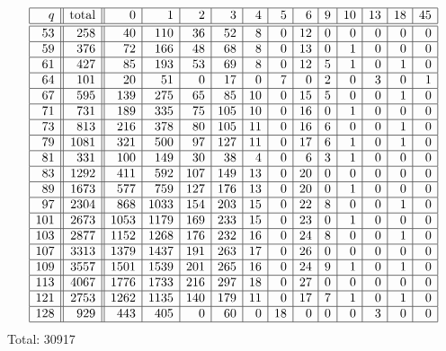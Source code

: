 $$
\begin{array}{|r||r||*{12}{r|}}
\hline
q  & \mbox{total}  & 0 & 1 & 2 & 3 & 4 & 5 & 6 & 9 & 10 & 13 & 18 & 45\\
\hline
\hline
53 & 258 & 40 & 110 & 36 & 52 & 8 & 0 & 12 & 0 & 0 & 0 & 0 & 0\\
\hline
59 & 376 & 72 & 166 & 48 & 68 & 8 & 0 & 13 & 0 & 1 & 0 & 0 & 0\\
\hline
61 & 427 & 85 & 193 & 53 & 69 & 8 & 0 & 12 & 5 & 1 & 0 & 1 & 0\\
\hline
64 & 101 & 20 & 51 & 0 & 17 & 0 & 7 & 0 & 2 & 0 & 3 & 0 & 1\\
\hline
67 & 595 & 139 & 275 & 65 & 85 & 10 & 0 & 15 & 5 & 0 & 0 & 1 & 0\\
\hline
71 & 731 & 189 & 335 & 75 & 105 & 10 & 0 & 16 & 0 & 1 & 0 & 0 & 0\\
\hline
73 & 813 & 216 & 378 & 80 & 105 & 11 & 0 & 16 & 6 & 0 & 0 & 1 & 0\\
\hline
79 & 1081 & 321 & 500 & 97 & 127 & 11 & 0 & 17 & 6 & 1 & 0 & 1 & 0\\
\hline
81 & 331 & 100 & 149 & 30 & 38 & 4 & 0 & 6 & 3 & 1 & 0 & 0 & 0\\
\hline
83 & 1292 & 411 & 592 & 107 & 149 & 13 & 0 & 20 & 0 & 0 & 0 & 0 & 0\\
\hline
89 & 1673 & 577 & 759 & 127 & 176 & 13 & 0 & 20 & 0 & 1 & 0 & 0 & 0\\
\hline
97 & 2304 & 868 & 1033 & 154 & 203 & 15 & 0 & 22 & 8 & 0 & 0 & 1 & 0\\
\hline
101 & 2673 & 1053 & 1179 & 169 & 233 & 15 & 0 & 23 & 0 & 1 & 0 & 0 & 0\\
\hline
103 & 2877 & 1152 & 1268 & 176 & 232 & 16 & 0 & 24 & 8 & 0 & 0 & 1 & 0\\
\hline
107 & 3313 & 1379 & 1437 & 191 & 263 & 17 & 0 & 26 & 0 & 0 & 0 & 0 & 0\\
\hline
109 & 3557 & 1501 & 1539 & 201 & 265 & 16 & 0 & 24 & 9 & 1 & 0 & 1 & 0\\
\hline
113 & 4067 & 1776 & 1733 & 216 & 297 & 18 & 0 & 27 & 0 & 0 & 0 & 0 & 0\\
\hline
121 & 2753 & 1262 & 1135 & 140 & 179 & 11 & 0 & 17 & 7 & 1 & 0 & 1 & 0\\
\hline
128 & 929 & 443 & 405 & 0 & 60 & 0 & 18 & 0 & 0 & 0 & 3 & 0 & 0\\
\hline
\end{array}
$$
Total: 30917
\bigskip
